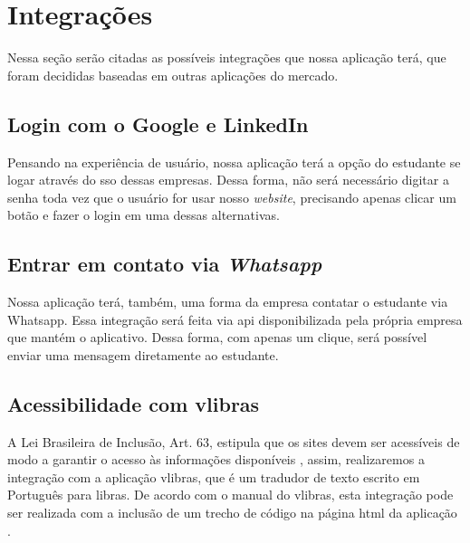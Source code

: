\section{Integrações}
Nessa seção serão citadas as possíveis integrações que nossa aplicação terá, que foram decididas baseadas em outras aplicações do mercado.

\subsection{Login com o Google e LinkedIn}
Pensando na experiência de usuário, nossa aplicação terá a opção do estudante se logar através do \ac{sso} dessas empresas. Dessa forma, não será necessário digitar a senha toda vez que o usuário for usar nosso \emph{website}, precisando apenas clicar um botão e fazer o login em uma dessas alternativas.

\subsection{Entrar em contato via \emph{Whatsapp}}
Nossa aplicação terá, também, uma forma da empresa contatar o estudante via Whatsapp. Essa integração será feita via \ac{api} disponibilizada pela própria empresa que mantém o aplicativo. Dessa forma, com apenas um clique, será possível enviar uma mensagem diretamente ao estudante.

\subsection{Acessibilidade com \gls{vlibras}}
A Lei Brasileira de Inclusão, Art. 63, estipula que os sites devem ser acessíveis de modo a garantir o acesso às informações disponíveis \cite{leiinclusao}, assim, realizaremos a integração com a aplicação \gls{vlibras}, que é um tradudor de texto escrito em Português para \ac{libras}. De acordo com o manual do \gls{vlibras}, esta integração pode ser realizada com a inclusão de um trecho de código na página \ac{html} da aplicação \cite{manualvlibras}.
